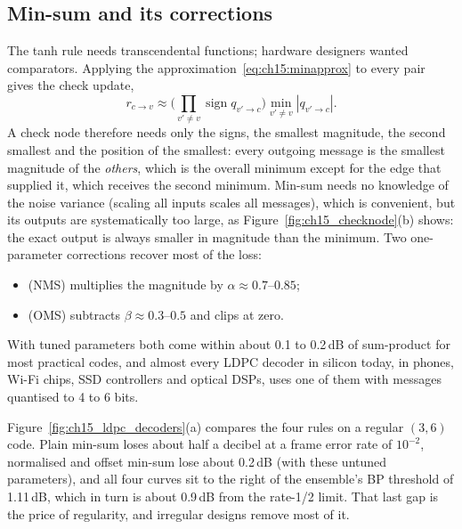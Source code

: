 \subsection{Min-sum and its corrections}

The tanh rule needs transcendental functions; hardware designers wanted comparators. Applying the
approximation~\eqref{eq:ch15:minapprox} to every pair gives the  check update,
\begin{equation}
r_{c\to v}\approx\Big(\prod_{v'\ne v}\operatorname{sign}q_{v'\to c}\Big)\min_{v'\ne v}|q_{v'\to c}|.
\label{eq:ch15:minsum}
\end{equation}
A check node therefore needs only the signs, the smallest magnitude, the second smallest and the
position of the smallest: every outgoing message is the smallest magnitude of the \emph{others},
which is the overall minimum except for the edge that supplied it, which receives the second minimum.
Min-sum needs no knowledge of the noise variance (scaling all inputs scales all messages), which is
convenient, but its outputs are systematically too large, as Figure~\ref{fig:ch15_checknode}(b) shows:
the exact output is always smaller in magnitude than the minimum. Two one-parameter corrections
recover most of the loss:
\begin{itemize}
\item {} (NMS) multiplies the magnitude by $\alpha\approx0.7$--$0.85$;
\item {} (OMS) subtracts $\beta\approx0.3$--$0.5$ and clips at zero.
\end{itemize}
With tuned parameters both come within about 0.1 to 0.2\,dB of sum-product for most practical codes,
and almost every LDPC decoder in silicon today, in phones, Wi-Fi chips, SSD controllers and optical
DSPs, uses one of them with messages quantised to 4 to 6 bits.


Figure~\ref{fig:ch15_ldpc_decoders}(a) compares the four rules on a regular $(3,6)$ code. Plain
min-sum loses about half a decibel at a frame error rate of $10^{-2}$, normalised and offset min-sum
lose about 0.2\,dB (with these untuned parameters), and all four curves sit to the right of the
ensemble's BP threshold of 1.11\,dB, which in turn is about 0.9\,dB from the rate-1/2 limit. That
last gap is the price of regularity, and irregular designs remove most of it.

